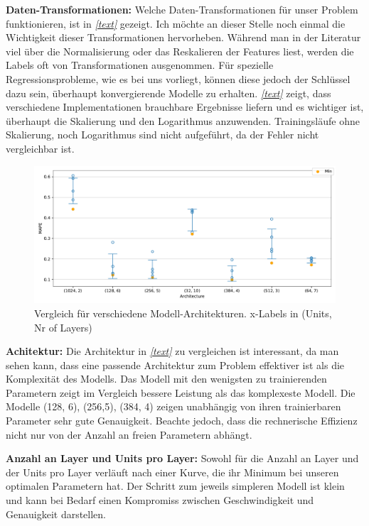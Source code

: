 \textbf{Daten-Transformationen:}
Welche Daten-Transformationen für unser Problem funktionieren, ist in \textit{\autoref{text}} gezeigt. Ich möchte an dieser Stelle noch einmal die Wichtigkeit dieser Transformationen hervorheben. Während man in der Literatur viel über die Normalisierung oder das Reskalieren der Features liest, werden die Labels oft von Transformationen ausgenommen. Für spezielle Regressionsprobleme, wie es bei uns vorliegt, können diese jedoch der Schlüssel dazu sein, überhaupt konvergierende Modelle zu erhalten. \textit{\autoref{text}} zeigt, dass verschiedene Implementationen brauchbare Ergebnisse liefern und es wichtiger ist, überhaupt die Skalierung und den Logarithmus anzuwenden. Trainingsläufe ohne Skalierung, noch Logarithmus sind nicht aufgeführt, da der Fehler nicht vergleichbar ist. \\
\begin{figure}[bt]
	\centering
	\includegraphics[width=13cm]{graphics/33}
	\caption{Vergleich für verschiedene Modell-Architekturen.
		x-Labels in (Units, Nr of Layers)}
\end{figure}

\textbf{Achitektur:} %
Die Architektur in \textit{\autoref{text}} zu vergleichen ist interessant, da man sehen kann, dass eine passende Architektur zum Problem effektiver ist als die Komplexität des Modells. Das Modell mit den wenigsten zu trainierenden Parametern zeigt im Vergleich bessere Leistung als das komplexeste Modell. Die Modelle (128, 6), (256,5), (384, 4) zeigen unabhängig von ihren trainierbaren Parameter sehr gute Genauigkeit. Beachte jedoch, dass die rechnerische Effizienz nicht nur von der Anzahl an freien Parametern abhängt. 

\textbf{Anzahl an Layer und Units pro Layer:} %
Sowohl für die Anzahl an Layer und der Units pro Layer verläuft nach einer Kurve, die ihr Minimum bei unseren optimalen Parametern hat. Der Schritt zum jeweils simpleren Modell ist klein und kann bei Bedarf einen Kompromiss zwischen Geschwindigkeit und Genauigkeit darstellen. 

